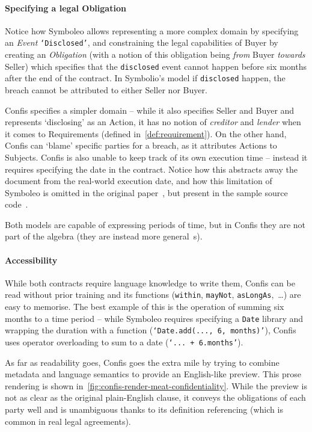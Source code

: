 \paragraph{Specifying a legal Obligation}
Notice how Symboleo allows representing a more complex domain by specifying an \emph{Event} \texttt{`Disclosed'}, and constraining the legal capabilities of Buyer by creating an \emph{Obligation} (with a notion of this obligation being \emph{from} Buyer \emph{towards} Seller) which specifies that the \texttt{disclosed} event cannot happen before six months after the end of the contract.
In Symbolio's model if \texttt{disclosed} happen, the breach cannot be attributed to either Seller nor Buyer.

Confis specifies a simpler domain -- while it also specifies Seller and Buyer and represents `disclosing' as an Action, it has no notion of \emph{creditor} and \emph{lender} when it comes to Requirements (defined in~\autoref{def:requirement}).
On the other hand, Confis can `blame' specific parties for a breach, as it attributes Actions to Subjects.
Confis is also unable to keep track of its own execution time -- instead it requires specifying the date in the contract.
Notice how this abstracts away the document from the real-world execution date, and how this limitation of Symboleo is omitted in the original paper~\cite{symboleo2020}, but present in the sample source code~\cite{symboleoMeat}.

Both models are capable of expressing periods of time, but in Confis they are not part of the algebra (they are instead more general~s).

\paragraph{Accessibility}

While both contracts require language knowledge to write them, Confis can be read without prior training and its functions (\texttt{within}, \texttt{mayNot}, \texttt{asLongAs},~\dots) are easy to memorise.
The best example of this is the operation of summing six months to a time period -- while Symboleo requires specifying a \texttt{Date} library and wrapping the duration with a function (\texttt{`Date.add(..., 6, months)'}), Confis uses operator overloading to sum to a date (\texttt{`... + 6.months'}).

As far as readability goes, Confis goes the extra mile by trying to combine metadata and language semantics to provide an English-like preview.
This prose rendering is shown in~\autoref{fig:confis-render-meat-confidentiality}.
While the preview is not as clear as the original plain-English clause, it conveys the obligations of each party well and is unambiguous thanks to its definition referencing (which is common in real legal agreements).

